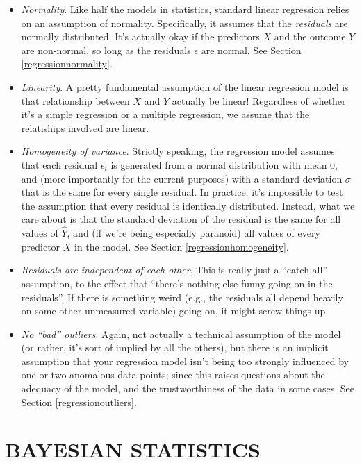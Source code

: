 \documentclass[
  11pt,
  a4paper,
  twoside,symmetric,openright]{book}
\providecommand{\tightlist}{%
  \setlength{\itemsep}{0pt}\setlength{\parskip}{0pt}}
\theoremstyle{break}
\theoremstyle{break}
\begin{document}
\begin{itemize}
\tightlist
\item
  \emph{Normality}. Like half the models in statistics, standard linear regression relies on an assumption of normality. Specifically, it assumes that the \emph{residuals} are normally distributed. It's actually okay if the predictors \(X\) and the outcome \(Y\) are non-normal, so long as the residuals \(\epsilon\) are normal. See Section \ref{regressionnormality}.
\item
  \emph{Linearity}. A pretty fundamental assumption of the linear regression model is that relationship between \(X\) and \(Y\) actually be linear! Regardless of whether it's a simple regression or a multiple regression, we assume that the relatiships involved are linear.
\item
  \emph{Homogeneity of variance}. Strictly speaking, the regression model assumes that each residual \(\epsilon_i\) is generated from a normal distribution with mean 0, and (more importantly for the current purposes) with a standard deviation \(\sigma\) that is the same for every single residual. In practice, it's impossible to test the assumption that every residual is identically distributed. Instead, what we care about is that the standard deviation of the residual is the same for all values of \(\hat{Y}\), and (if we're being especially paranoid) all values of every predictor \(X\) in the model. See Section \ref{regressionhomogeneity}.
\item
  \emph{Residuals are independent of each other}. This is really just a ``catch all'' assumption, to the effect that ``there's nothing else funny going on in the residuals''. If there is something weird (e.g., the residuals all depend heavily on some other unmeasured variable) going on, it might screw things up.
\item
  \emph{No ``bad'' outliers}. Again, not actually a technical assumption of the model (or rather, it's sort of implied by all the others), but there is an implicit assumption that your regression model isn't being too strongly influenced by one or two anomalous data points; since this raises questions about the adequacy of the model, and the trustworthiness of the data in some cases. See Section \ref{regressionoutliers}.
\end{itemize}

\part*{BAYESIAN STATISTICS}\label{part-bayesian-statistics}
\end{document}
